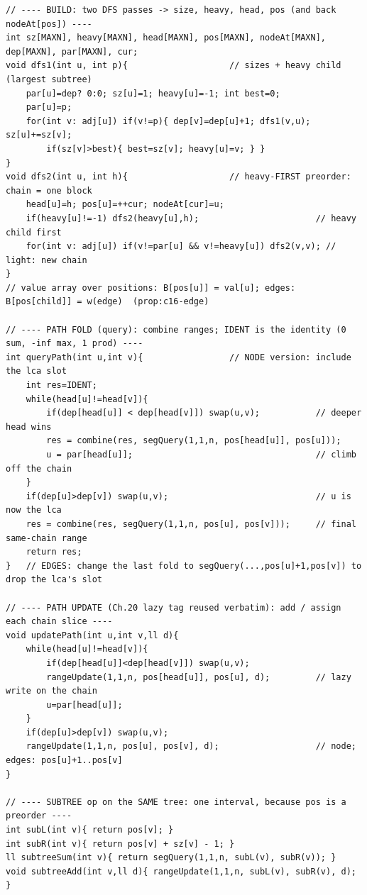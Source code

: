 \begin{lstlisting}[caption={Chapter 22 kit: dfs1/dfs2 build + path fold + path lazy-add + subtree range + the edge-to-node reduction, all over one pos-order segment tree, in one place}, label={lst:c16-kit}]
// ---- BUILD: two DFS passes -> size, heavy, head, pos (and back nodeAt[pos]) ----
int sz[MAXN], heavy[MAXN], head[MAXN], pos[MAXN], nodeAt[MAXN], dep[MAXN], par[MAXN], cur;
void dfs1(int u, int p){                    // sizes + heavy child (largest subtree)
    par[u]=dep? 0:0; sz[u]=1; heavy[u]=-1; int best=0;
    par[u]=p;
    for(int v: adj[u]) if(v!=p){ dep[v]=dep[u]+1; dfs1(v,u); sz[u]+=sz[v];
        if(sz[v]>best){ best=sz[v]; heavy[u]=v; } }
}
void dfs2(int u, int h){                    // heavy-FIRST preorder: chain = one block
    head[u]=h; pos[u]=++cur; nodeAt[cur]=u;
    if(heavy[u]!=-1) dfs2(heavy[u],h);                       // heavy child first
    for(int v: adj[u]) if(v!=par[u] && v!=heavy[u]) dfs2(v,v); // light: new chain
}
// value array over positions: B[pos[u]] = val[u]; edges: B[pos[child]] = w(edge)  (prop:c16-edge)

// ---- PATH FOLD (query): combine ranges; IDENT is the identity (0 sum, -inf max, 1 prod) ----
int queryPath(int u,int v){                 // NODE version: include the lca slot
    int res=IDENT;
    while(head[u]!=head[v]){
        if(dep[head[u]] < dep[head[v]]) swap(u,v);           // deeper head wins
        res = combine(res, segQuery(1,1,n, pos[head[u]], pos[u]));
        u = par[head[u]];                                    // climb off the chain
    }
    if(dep[u]>dep[v]) swap(u,v);                             // u is now the lca
    res = combine(res, segQuery(1,1,n, pos[u], pos[v]));     // final same-chain range
    return res;
}   // EDGES: change the last fold to segQuery(...,pos[u]+1,pos[v]) to drop the lca's slot

// ---- PATH UPDATE (Ch.20 lazy tag reused verbatim): add / assign each chain slice ----
void updatePath(int u,int v,ll d){
    while(head[u]!=head[v]){
        if(dep[head[u]]<dep[head[v]]) swap(u,v);
        rangeUpdate(1,1,n, pos[head[u]], pos[u], d);         // lazy write on the chain
        u=par[head[u]];
    }
    if(dep[u]>dep[v]) swap(u,v);
    rangeUpdate(1,1,n, pos[u], pos[v], d);                   // node; edges: pos[u]+1..pos[v]
}

// ---- SUBTREE op on the SAME tree: one interval, because pos is a preorder ----
int subL(int v){ return pos[v]; }
int subR(int v){ return pos[v] + sz[v] - 1; }
ll subtreeSum(int v){ return segQuery(1,1,n, subL(v), subR(v)); }
void subtreeAdd(int v,ll d){ rangeUpdate(1,1,n, subL(v), subR(v), d); }
\end{lstlisting}

